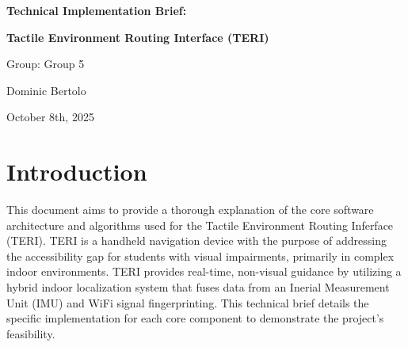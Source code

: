 \documentclass{article}
\begin{document}
\begin{titlepage}
    \centering
    
    \vspace*{\fill}
    
    {\Huge\bfseries Technical Implementation Brief: \par}
    {\Huge\bfseries Tactile Environment Routing Interface (TERI)\par}
    
    \vspace{2cm}
    
    {\Large Group: Group 5\par}
    \vspace{1cm}
    {\large Dominic Bertolo\par}
    
    \vspace{1.5cm}
    
    {\large October 8th, 2025\par}
    
    \vspace*{\fill}
\end{titlepage}

\section{Introduction}
This document aims to provide a thorough explanation of the core software architecture and algorithms used for the Tactile Environment Routing Inferface (TERI). TERI is a handheld navigation device with the purpose of addressing the accessibility gap for students with visual impairments, primarily in complex indoor environments. TERI provides real-time, non-visual guidance by utilizing a hybrid indoor localization system that fuses data from an Inerial Measurement Unit (IMU) and WiFi signal fingerprinting. This technical brief details the specific implementation for each core component to demonstrate the project's feasibility.
\end{document}
